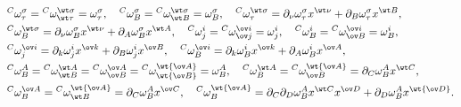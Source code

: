 \begin{equation}


\begin{split}


&{}^C\omega^\sigma_\tau={}^C\omega^{\wt\sigma}_{\wt\tau}=


\omega^\sigma_\tau,\quad


{}^C\omega^\sigma_B={}^C\omega^{\wt\sigma}_{\wt B}=


\omega^\sigma_B,\quad


{}^C\omega^{\wt\sigma}_\tau=\partial_\nu\omega^\sigma_\tau


x^{\wt\nu}+\partial_B\omega^\sigma_\tau x^{\wt B},\\


%


&{}^C\omega^{\wt\sigma}_B=\partial_\nu\omega^\sigma_B


x^{\wt\nu}+\partial_A\omega^\sigma_B x^{\wt A},\quad


{}^C\omega^i_j={}^C\omega^{\ov i}_{\ov j}=\omega^i_j,\quad


{}^C\omega^i_B={}^C\omega^{\ov i}_{\ov B}=\omega^i_B, \\


%


&{}^C\omega^{\ov i}_j=\partial_k\omega^i_jx^{\ov k}+


\partial_B\omega^i_j x^{\ov B},\quad


{}^C\omega^{\ov i}_B=\partial_k\omega^i_B x^{\ov k}+


\partial_A\omega^i_B x^{\ov A},\\


&{}^C\omega^A_B={}^C\omega^{\wt A}_{\wt B}=


{}^C\omega^{\ov A}_{\ov B}={}^C\omega^{\wt{\ov A}}_{\wt{\ov B}}=


\omega^A_B,\quad


{}^C\omega^{\wt A}_B={}^C\omega^{\wt{\ov A}}_{\ov B}=


\partial_C\omega^A_B x^{\wt C},\\


&{}^C\omega^{\ov A}_B={}^C\omega^{\wt{\ov A}}_{\wt B}=


\partial_C\omega^A_B x^{\ov C},\quad


{}^C\omega^{\wt{\ov A}}_B=\partial_C\partial_D


\omega^A_B x^{\wt C}x^{\ov D}+


\partial_D\omega^A_B x^{\wt{\ov D}}.


\end{split}


\end{equation}


